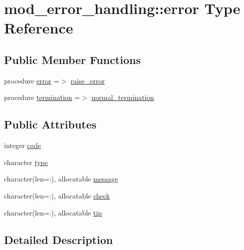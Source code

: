 \hypertarget{structmod__error__handling_1_1error}{}\section{mod\+\_\+error\+\_\+handling\+:\+:error Type Reference}
\label{structmod__error__handling_1_1error}
\subsection*{Public Member Functions}
\begin{DoxyCompactItemize}
\item 
procedure \hyperlink{structmod__error__handling_1_1error_a154c9140ca242401fed44b67d2b855fe}{error} =$>$ \hyperlink{namespacemod__error__handling_a93bd5f43a4db84dd187231ce58493d0a}{raise\+\_\+error}
\item 
procedure \hyperlink{structmod__error__handling_1_1error_a9a38f19a843710ec0b4284e29cd8f6f0}{termination} =$>$ \hyperlink{namespacemod__error__handling_a54366620ef058729af93f4bc7d507df7}{normal\+\_\+termination}
\end{DoxyCompactItemize}
\subsection*{Public Attributes}
\begin{DoxyCompactItemize}
\item 
integer \hyperlink{structmod__error__handling_1_1error_a631aa8dd70ac0884b9d71440f4811cfe}{code}
\item 
character \hyperlink{structmod__error__handling_1_1error_abe8bce46119248009e003845d959f21a}{type}
\item 
character(len=\+:), allocatable \hyperlink{structmod__error__handling_1_1error_ae7b71e5d1a4f545a4bbfe080e27088cb}{message}
\item 
character(len=\+:), allocatable \hyperlink{structmod__error__handling_1_1error_a42b62dc65492c74280602825380d6514}{check}
\item 
character(len=\+:), allocatable \hyperlink{structmod__error__handling_1_1error_a65c72d5ba9239b5c0d08e9430beb88a9}{tip}
\end{DoxyCompactItemize}


\subsection{Detailed Description}


